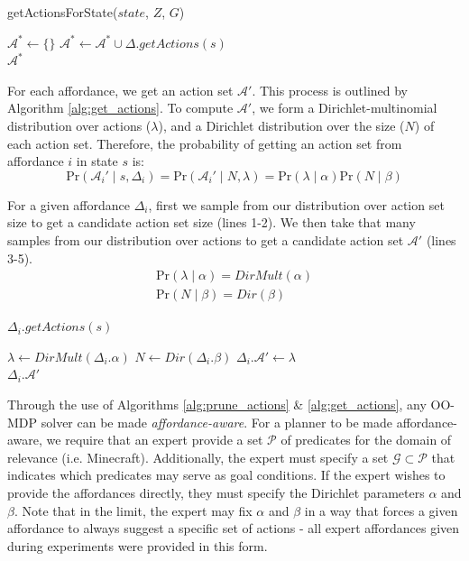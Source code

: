 \documentclass[letterpaper]{article}
\begin{document}
\begin{algorithm}
  \caption{getActionsForState($state$, $Z$, $G$)}
  \begin{algorithmic}[1]
    \State $\mathcal{A}^* \leftarrow \{\}$
    \State $\mathcal{A}^* \leftarrow \mathcal{A}^* \cup \Delta.getActions(s)$
    \EndIf
    \EndFor \\
    \Return $\mathcal{A}^*$
  \end{algorithmic}
  \label{alg:prune_actions}
\end{algorithm}

For each affordance, we get an action set $\mathcal{A}'$. This 
process is outlined by Algorithm \ref{alg:get_actions}. To compute $\mathcal{A}'$, we form a Dirichlet-multinomial distribution
over actions ($\lambda$), and a Dirichlet distribution over the size ($N$) of each action set. Therefore, the probability of getting an action set from affordance $i$ in state $s$ is:
\begin{equation}
\text{Pr}(\mathcal{A}_i' \mid s,\Delta_i) = \text{Pr}(\mathcal{A}_i' \mid N, \lambda) = \text{Pr}(\lambda \mid \alpha) \text{Pr}(N \mid \beta)
\end{equation}

For a given affordance $\Delta_i$, first we sample from our distribution over action set size to get a candidate action set size (lines 1-2). We then
take that many samples from our distribution over actions to get a candidate action set $\mathcal{A}'$ (lines 3-5).
\begin{align}
\text{Pr}(\lambda \mid \alpha) = DirMult(\alpha) \\
\text{Pr}(N \mid \beta) = Dir(\beta)
\end{align}

\begin{algorithm}
  \caption{$\Delta_i.getActions(s)$}
  \begin{algorithmic}[1]
    \State $\lambda \leftarrow DirMult(\Delta_i.\alpha)$
    \State $N \leftarrow Dir(\Delta_i.\beta)$
    \State $\Delta_i.\mathcal{A}' \leftarrow \lambda$
    \EndFor \\
    \Return $\Delta_i.\mathcal{A}'$
  \end{algorithmic}
  \label{alg:get_actions}
\end{algorithm}

Through the use of Algorithms \ref{alg:prune_actions} \& \ref{alg:get_actions}, any OO-MDP solver can be made
{\it affordance-aware}. For a planner to be made affordance-aware, we require that an expert provide a set $\mathcal{P}$ of predicates
for the domain of relevance (i.e. Minecraft). Additionally, the expert must specify a set
$\mathcal{G} \subset \mathcal{P}$ that indicates which predicates may serve as goal conditions. If the expert wishes
to provide the affordances directly, they must specify the Dirichlet parameters $\alpha$ and $\beta$. Note that
in the limit, the expert may fix $\alpha$ and $\beta$ in a way that forces a given
affordance to always suggest a specific set of actions - all expert affordances given during experiments
were provided in this form.
\end{document}
